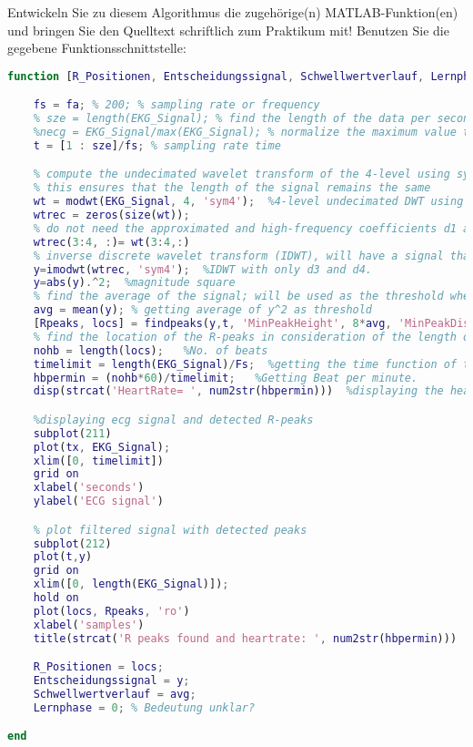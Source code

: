 \documentclass[a4paper,12pt,titlepage]{scrartcl}
\begin{document}
\subsubsection{}
Entwickeln Sie zu diesem Algorithmus die zugehörige(n) MATLAB-Funktion(en) und bringen Sie den Quelltext schriftlich zum Praktikum mit! Benutzen Sie die gegebene Funktionsschnittstelle:
\begin{lstlisting}[basicstyle=\tiny, language=matlab]
function [R_Positionen, Entscheidungssignal, Schwellwertverlauf, Lernphase] = QRS_Detektion (EKG_Signal, fa);

    fs = fa; % 200; % sampling rate or frequency
    % sze = length(EKG_Signal); % find the length of the data per second
    %necg = EKG_Signal/max(EKG_Signal); % normalize the maximum value to unity (amplitude)
    t = [1 : sze]/fs; % sampling rate time

    % compute the undecimated wavelet transform of the 4-level using sym4
    % this ensures that the length of the signal remains the same
    wt = modwt(EKG_Signal, 4, 'sym4');  %4-level undecimated DWT using sym4
    wtrec = zeros(size(wt));
    % do not need the approximated and high-frequency coefficients d1 and d2; extract d3 and d4
    wtrec(3:4, :)= wt(3:4,:)
    % inverse discrete wavelet transform (IDWT), will have a signal that has only the r-peaks
    y=imodwt(wtrec, 'sym4');  %IDWT with only d3 and d4.
    y=abs(y).^2;  %magnitude square
    % find the average of the signal; will be used as the threshold when finding the signal peak
    avg = mean(y); % getting average of y^2 as threshold
    [Rpeaks, locs] = findpeaks(y,t, 'MinPeakHeight', 8*avg, 'MinPeakDistance', 50); % finding peaks
    % find the location of the R-peaks in consideration of the length of the signal. It represents the number of beats
    nohb = length(locs);   %No. of beats
    timelimit = length(EKG_Signal)/Fs;  %getting the time function of the signal
    hbpermin = (nohb*60)/timelimit;   %Getting Beat per minute.
    disp(strcat('HeartRate= ', num2str(hbpermin)))  %displaying the heartrate

    %displaying ecg signal and detected R-peaks
    subplot(211)
    plot(tx, EKG_Signal);
    xlim([0, timelimit])
    grid on
    xlabel('seconds')
    ylabel('ECG signal')

    % plot filtered signal with detected peaks
    subplot(212)
    plot(t,y)
    grid on
    xlim([0, length(EKG_Signal)]);
    hold on
    plot(locs, Rpeaks, 'ro')
    xlabel('samples')
    title(strcat('R peaks found and heartrate: ', num2str(hbpermin)))

    R_Positionen = locs;
    Entscheidungssignal = y;
    Schwellwertverlauf = avg;
    Lernphase = 0; % Bedeutung unklar?

end
\end{lstlisting}
\end{document}
